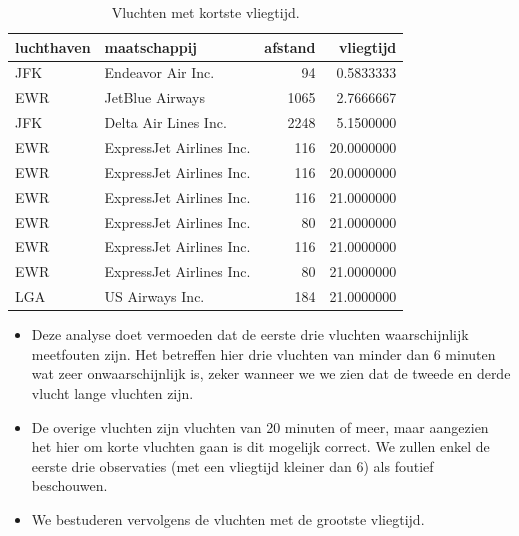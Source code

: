 \documentclass[]{tufte-book}
\providecommand{\tightlist}{%
  \setlength{\itemsep}{0pt}\setlength{\parskip}{0pt}}
\begin{document}
\begin{table}

\caption{\label{tab:5-11b}Vluchten met kortste vliegtijd.}
\centering
\fontsize{10}{12}\selectfont
\begin{tabular}[t]{llrr}
\toprule
luchthaven & maatschappij & afstand & vliegtijd\\
\midrule
JFK & Endeavor Air Inc. & 94 & 0.5833333\\
EWR & JetBlue Airways & 1065 & 2.7666667\\
JFK & Delta Air Lines Inc. & 2248 & 5.1500000\\
EWR & ExpressJet Airlines Inc. & 116 & 20.0000000\\
EWR & ExpressJet Airlines Inc. & 116 & 20.0000000\\
\addlinespace
EWR & ExpressJet Airlines Inc. & 116 & 21.0000000\\
EWR & ExpressJet Airlines Inc. & 80 & 21.0000000\\
EWR & ExpressJet Airlines Inc. & 116 & 21.0000000\\
EWR & ExpressJet Airlines Inc. & 80 & 21.0000000\\
LGA & US Airways Inc. & 184 & 21.0000000\\
\bottomrule
\end{tabular}
\end{table}

\begin{itemize}
\tightlist
\item
  Deze analyse doet vermoeden dat de eerste drie vluchten waarschijnlijk meetfouten zijn. Het betreffen hier drie vluchten van minder dan 6 minuten wat zeer onwaarschijnlijk is, zeker wanneer we we zien dat de tweede en derde vlucht lange vluchten zijn.
\item
  De overige vluchten zijn vluchten van 20 minuten of meer, maar aangezien het hier om korte vluchten gaan is dit mogelijk correct. We zullen enkel de eerste drie observaties (met een vliegtijd kleiner dan 6) als foutief beschouwen.
\item
  We bestuderen vervolgens de vluchten met de grootste vliegtijd.
\end{itemize}
\end{document}
